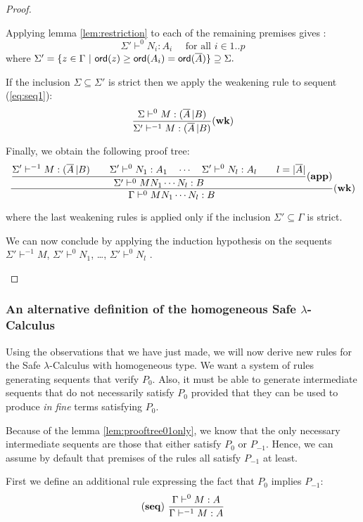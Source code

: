 \begin{proof}
\begin{itemize}
Applying lemma \ref{lem:restriction} to each of the remaining
premises gives  :
$$ \Sigma' \vdash^0 N_i : A_i \quad \mbox{ for all } i \in 1..p$$
where $\Sigma' = \{ z \in \Gamma \ | \ {\sf ord}(z) \geq {\sf ord}(A_i) =
{\sf ord}(\overline{A}) \} \supseteq \Sigma.$

If the inclusion $\Sigma \subseteq \Sigma'$ is strict then we apply the weakening rule to sequent (\ref{eq:seq1}):
$$ \frac{\displaystyle \Sigma \vdash^0 M : (\overline{A} \, | B)}{\Sigma' \vdash^{-1} M : (\overline{A} \, | B)} \mathbf{(wk)} $$

Finally, we obtain the following proof tree:
$$  \frac{\displaystyle 
        \frac{\displaystyle 
            { \Sigma' \vdash^{-1} M : (\overline{A} \, | B)
            \qquad
            \Sigma' \vdash^0 N_1 : A_1 \quad \cdots \quad \Sigma' \vdash^0 N_{l} : A_l \qquad l = |\overline{A}|
            }
        }{
            \Sigma' \vdash^0 M N_1 \cdots N_{l} : B
        } \mathbf{(app)}
    }{
         \Gamma \vdash^0 M N_1 \cdots N_{l} : B
    } \mathbf{(wk)}
$$

where the last weakening rules is applied only if the inclusion $\Sigma' \subseteq \Gamma$ is strict.

We can now conclude by applying the induction hypothesis on the
sequents $\Sigma' \vdash^{-1} M$, $\Sigma' \vdash^0 N_1$, \ldots,
$\Sigma' \vdash^0 N_l$ .
\end{itemize}
\end{proof}

\subsubsection{An alternative definition of the homogeneous Safe $\lambda$-Calculus}

Using the observations that we have just made, we will now derive
new rules for the Safe $\lambda$-Calculus with homogeneous type. We
want a system of rules generating sequents that verify $P_0$. Also,
it must be able to generate intermediate sequents that do not
necessarily satisfy $P_0$ provided that they can be used to produce
\emph{in fine} terms satisfying $P_0$.

Because of the lemma \ref{lem:prooftree01only}, we know that the
only necessary intermediate sequents are those that either satisfy
$P_0$ or $P_{-1}$. Hence, we can assume by default that premises of
the rules all satisfy $P_{-1}$ at least.

First we define an additional rule expressing the fact that $P_0$
implies $P_{-1}$:
$$ \mathbf{(seq)} \  \frac{\displaystyle \Gamma \vdash^{0} M : A}{\Gamma \vdash^{-1} M : A} $$


